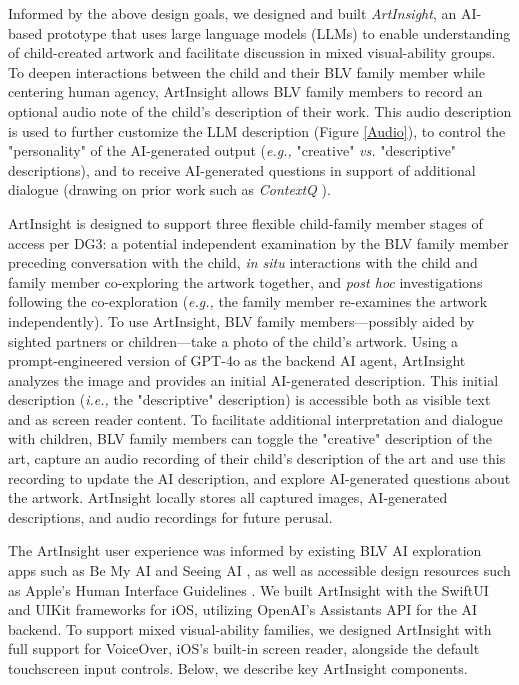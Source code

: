 \documentclass[sigconf]{acmart}
\begin{document}
Informed by the above design goals, we designed and built \textit{ArtInsight}, an AI-based prototype that uses large language models (LLMs) to enable understanding of child-created artwork and facilitate discussion in mixed visual-ability groups. To deepen interactions between the child and their BLV family member while centering human agency, ArtInsight allows BLV family members to record an optional audio note of the child's description of their work. This audio description is used to further customize the LLM description (Figure \ref{Audio}), to control the "personality" of the AI-generated output (\textit{e.g.,} "creative" \textit{vs.} "descriptive" descriptions), and to receive AI-generated questions in support of additional dialogue (drawing on prior work such as \textit{ContextQ} \cite{Dietz_ContextQ}).

ArtInsight is designed to support three flexible child-family member stages of access per DG3: a potential independent examination by the BLV family member preceding conversation with the child, \textit{in situ} interactions with the child and family member co-exploring the artwork together, and \textit{post hoc} investigations following the co-exploration (\textit{e.g.,} the family member re-examines the artwork independently). To use ArtInsight, BLV family members---possibly aided by sighted partners or children---take a photo of the child's artwork. Using a prompt-engineered version of GPT-4o \cite{explore_gpts_2024} as the backend AI agent, ArtInsight analyzes the image and provides an initial AI-generated description. This initial description (\textit{i.e.,} the "descriptive" description) is accessible both as visible text and as screen reader content. To facilitate additional interpretation and dialogue with children, BLV family members can toggle the "creative" description of the art, capture an audio recording of their child's description of the art and use this recording to update the AI description, and explore AI-generated questions about the artwork. ArtInsight locally stores all captured images, AI-generated descriptions, and audio recordings for future perusal.

The ArtInsight user experience was informed by existing BLV AI exploration apps such as Be My AI \cite{be_my_ai_2024} and Seeing AI \cite{seeing_ai}, as well as accessible design resources such as Apple's Human Interface Guidelines \cite{hig_accessibility}. We built ArtInsight with the SwiftUI \cite{swiftui} and UIKit \cite{uikit} frameworks for iOS, utilizing OpenAI's Assistants API \cite{openai_assistants} for the AI backend. To support mixed visual-ability families, we designed ArtInsight with full support for VoiceOver, iOS's built-in screen reader, \cite{voiceoverios} alongside the default touchscreen input controls. Below, we describe key ArtInsight components.
\end{document}

